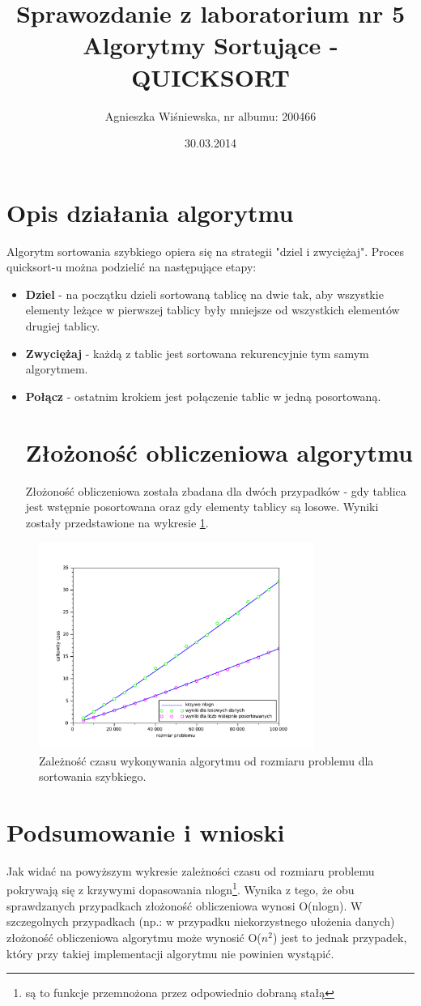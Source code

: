 \documentclass{mwart}
\title{\Huge{Sprawozdanie z laboratorium nr 5 \\
Algorytmy Sortujące -QUICKSORT }}
\author{Agnieszka Wiśniewska, nr albumu: 200466}
\date{30.03.2014}
\begin{document}
\maketitle

\section{Opis działania algorytmu}
Algorytm sortowania szybkiego opiera się na strategii "dziel i zwyciężaj". Proces quicksort-u można podzielić na następujące etapy:
\begin{itemize}
\item{\textbf{Dziel}
- na początku dzieli sortowaną tablicę na dwie tak, aby wszystkie elementy leżące w pierwszej tablicy były mniejsze od wszystkich elementów drugiej tablicy.}
\item{\textbf{Zwyciężaj}
- każdą z tablic jest sortowana rekurencyjnie tym samym algorytmem.}
\item{\textbf{Połącz}
- ostatnim krokiem jest połączenie tablic w jedną posortowaną.}
\section{Złożoność obliczeniowa algorytmu}
Złożoność obliczeniowa została zbadana dla dwóch przypadków - gdy tablica jest wstępnie posortowana oraz gdy elementy tablicy są losowe.
Wyniki zostały przedstawione na wykresie \ref{trend}.
\end{itemize}

\begin{figure}[!htp]
\centering
\includegraphics[width=0.8\textwidth]{files/trend.pdf}
\caption{Zależność czasu wykonywania algorytmu od rozmiaru problemu dla sortowania szybkiego.\label{trend}} 
\end{figure}
\newpage
\section{Podsumowanie i wnioski}
Jak widać na powyższym wykresie zależności czasu od rozmiaru problemu pokrywają się z krzywymi dopasowania nlogn\footnote{są to funkcje przemnożona przez odpowiednio dobraną stałą}. Wynika z tego, że obu sprawdzanych przypadkach złożoność obliczeniowa wynosi O(nlogn). W szczegolnych przypadkach (np.: w przypadku niekorzystnego ułożenia danych) złożoność obliczeniowa algorytmu może wynosić O($n^{2}$) jest to jednak przypadek, który przy takiej implementacji algorytmu nie powinien wystąpić.
\end{document}
